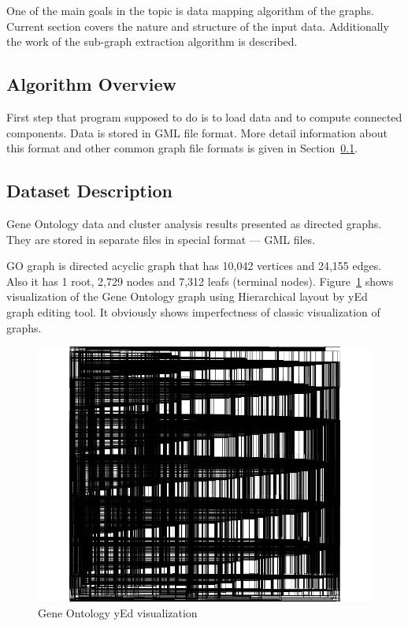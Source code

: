
One of the main goals in the topic is data mapping algorithm of the graphs.
Current section covers the nature and structure of the input data.
Additionally the work of the sub-graph extraction algorithm is described.

\subsection{Algorithm Overview}
\label{sec:algorithm}

First step that program supposed to do is to load data and to compute connected components.
Data is stored in GML file format.
More detail information about this format and other common graph file formats is given in Section~\ref{sec:algorithm}.

\subsection{Dataset Description}
\label{sec:dataset_description}
Gene Ontology data and cluster analysis results presented as directed graphs.
They are stored in separate files in special format --- GML files.


GO graph is directed acyclic graph that has 10,042 vertices and  24,155 edges.
Also it has 1 root, 2,729 nodes and 7,312 leafs (terminal nodes).
Figure~\ref{fig:yed_GO_vis} shows visualization of the Gene Ontology graph using Hierarchical layout by yEd~\cite{yed} graph editing tool.
It obviously shows imperfectness of classic visualization of graphs.


\begin{figure}[h!]
\centering
\includegraphics[scale=0.3]{pictures/yEd_GO.png}
\caption{Gene Ontology yEd visualization}
\label{fig:yed_GO_vis}
\end{figure}


